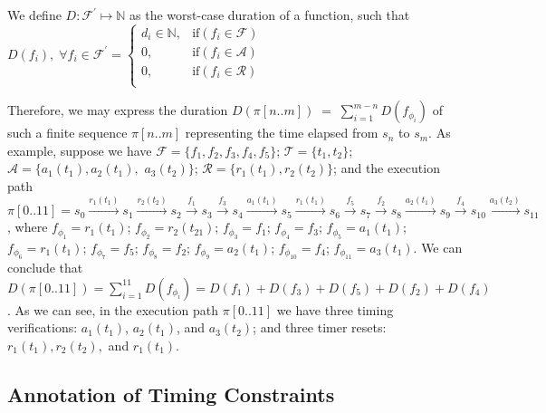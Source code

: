 \documentclass{llncs}
\begin{document}
We define $D: \mathcal{F}^{'} \mapsto \mathbb{N}$ 
as the worst-case duration of a function, such that
$D(f_i),\;\forall f_i \in \mathcal{F}^{'} = 
\begin{cases}
d_i \in \mathbb{N}, & \mbox{if} (f_i \in \mathcal{F}) \\
0, & \mbox{if} (f_i \in \mathcal{A}) \\
0, &  \mbox{if} (f_i \in \mathcal{R}) \\
\end{cases}
$

Therefore, we may express the duration $D(\pi [n ..m]) \; = \; \sum_{i=1}^{m-n}D(f_{\phi_{i}})$ 
of such a finite sequence $\pi [n ..m]$
representing the time elapsed from $s_n$ to $s_m$.
As example, suppose we have
$\mathcal{F} = \{f_1, f_2, f_3, f_4, f_5\}$;
$\mathcal{T} = \{t_1, t_2\}$;
$\mathcal{A} = \{a_1(t_1), a_2(t_1),$ $a_3(t_2)\}$;
$\mathcal{R} = \{r_1(t_1), r_2(t_2)\}$;
and  the execution path
$\pi [0..11]= s_0 \stackrel{r_1(t_1)}   \longrightarrow s_1 \stackrel{r_2(t_2)}   \longrightarrow 
             s_2 \stackrel{f_1}      \longrightarrow s_3 \stackrel{f_3}       \longrightarrow
             s_4 \stackrel{a_1(t_1)} \longrightarrow s_5 \stackrel{r_1(t_1)}    \longrightarrow 
             s_6 \stackrel{f_5}      \longrightarrow s_7 \stackrel{f_2}       \longrightarrow
             s_8 \stackrel{a_2(t_1)} \longrightarrow s_9 \stackrel{f_4}       \longrightarrow 
             s_{10} \stackrel{a_3(t_2)}  \longrightarrow s_{11}
$, where
$f_{\phi_{1}}=r_1(t_1)$;
$f_{\phi_{2}}=r_2(t_21)$;
$f_{\phi_{3}}=f_1$;
$f_{\phi_{4}}=f_3$;
$f_{\phi_{5}}=a_1(t_1)$;
$f_{\phi_{6}}=r_1(t_1)$;
$f_{\phi_{7}}=f_5$;
$f_{\phi_{8}}=f_2$;
$f_{\phi_{9}}=a_2(t_1)$;
$f_{\phi_{10}}=f_4$;
$f_{\phi_{11}}=a_3(t_1)$.
We can conclude that
$D(\pi [0 ..11]) = \sum_{i=1}^{11} D(f_{\phi_{i}}) = D(f_1) + D(f_3) + D(f_5) + D(f_2) + D(f_4)$.
As we can see, in the execution path $\pi[0 ..11]$ we have three timing verifications: $a_1(t_1)$, $a_2(t_1)$, and $a_3(t_2)$; and 
three timer resets: $r_1(t_1), r_2(t_2),$ and $r_1(t_1)$.



\subsection{Annotation of Timing Constraints}
\label{section:annotation}
\end{document}
